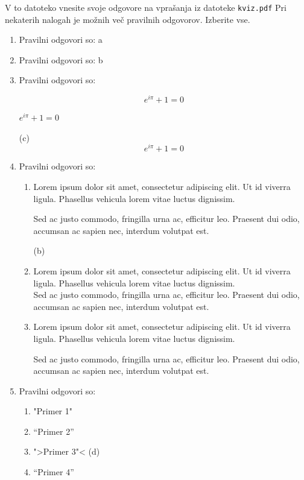 \documentclass[11pt]{article}
\begin{document}
V to datoteko vnesite svoje odgovore na vprašanja iz datoteke \texttt{kviz.pdf}
Pri nekaterih nalogah je možnih več pravilnih odgovorov. Izberite vse.

\begin{enumerate}
    \item Pravilni odgovori so: %
    a
    \item Pravilni odgovori so: %
    b
    \item Pravilni odgovori so:  %
    
      \[ e^{i \pi} + 1 = 0 \]
      \begin{center}
          \( e^{i \pi} + 1 = 0 \)
      \end{center}
     (c)
      \begin{equation*}
          e^{i \pi} + 1 = 0
      \end{equation*}

    \item Pravilni odgovori so: %
        \begin{enumerate}
            \item {
Lorem ipsum dolor sit amet, consectetur adipiscing 
elit. Ut id viverra ligula. Phasellus vehicula lorem 
vitae luctus dignissim. 
                
Sed ac justo commodo, fringilla urna ac, efficitur 
leo. Praesent dui odio, accumsan ac sapien nec, 
interdum volutpat est. 
            }
           (b)
            \item {
Lorem ipsum dolor sit amet, consectetur adipiscing 
elit. Ut id viverra ligula. Phasellus vehicula lorem 
vitae luctus dignissim. \\
Sed ac justo commodo, fringilla urna ac, efficitur 
leo. Praesent dui odio, accumsan ac sapien nec, 
interdum volutpat est.             }
            \item {
Lorem ipsum dolor sit amet, consectetur adipiscing 
elit. Ut id viverra ligula. Phasellus vehicula lorem 
vitae luctus dignissim. \par
Sed ac justo commodo, fringilla urna ac, efficitur 
leo. Praesent dui odio, accumsan ac sapien nec, 
interdum volutpat est.             }
        \end{enumerate}
    
      \item Pravilni odgovori so: %
        \begin{enumerate}
          \item "Primer 1"
          \item ``Primer 2''
          \item ">Primer 3"<
         (d)
          \item "`Primer 4"'
        \end{enumerate}


\end{enumerate}
\end{document}
